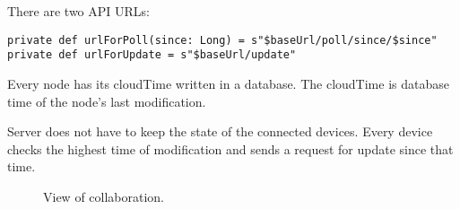 There are two API URLs:

\begin{verbatim}
private def urlForPoll(since: Long) = s"$baseUrl/poll/since/$since"
private def urlForUpdate = s"$baseUrl/update"
\end{verbatim}

Every node has its cloudTime written in a database. The cloudTime is database time of the node's last modification.

Server does not have to keep the state of the connected devices. Every device checks the highest time of modification and sends a request for update since that time.


\begin{figure}[h]
	\centering
	\caption{View of collaboration.}
	\label{fig:screen-collaboration}
\end{figure}
